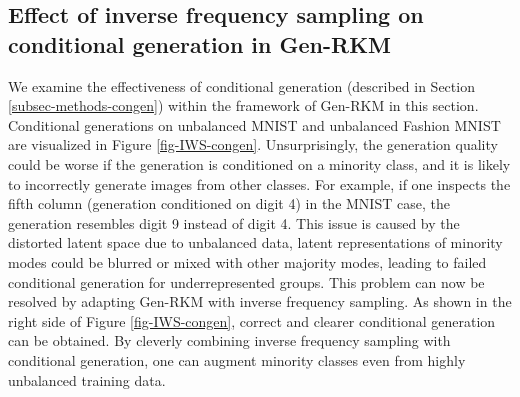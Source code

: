 \subsection{Effect of inverse frequency sampling on conditional generation in Gen-RKM}
We examine the effectiveness of conditional generation (described in Section \ref{subsec-methods-congen}) within the framework of Gen-RKM in this section. Conditional generations on unbalanced MNIST and unbalanced Fashion MNIST are visualized in Figure \ref{fig-IWS-congen}. Unsurprisingly, the generation quality could be worse if the generation is conditioned on a minority class, and it is likely to incorrectly generate images from other classes. For example, if one inspects the fifth column (generation conditioned on digit 4) in the MNIST case, the generation resembles digit 9 instead of digit 4. This issue is caused by the distorted latent space due to unbalanced data, latent representations of minority modes could be blurred or mixed with other majority modes, leading to failed conditional generation for underrepresented groups. This problem can now be resolved by adapting Gen-RKM with inverse frequency sampling. As shown in the right side of Figure \ref{fig-IWS-congen}, correct and clearer conditional generation can be obtained. By cleverly combining inverse frequency sampling with conditional generation, one can augment minority classes even from highly unbalanced training data.
\FloatBarrier

